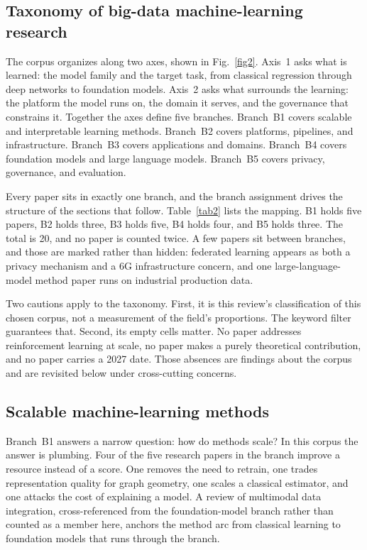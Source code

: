 \documentclass[pdflatex,sn-basic,Numbered]{sn-jnl}%
\begin{document}
\subsection{Taxonomy of big-data machine-learning research}\label{subsec22}

The corpus organizes along two axes, shown in Fig.~\ref{fig2}. Axis~1 asks what is learned: the model family and the target task, from classical regression through deep networks to foundation models. Axis~2 asks what surrounds the learning: the platform the model runs on, the domain it serves, and the governance that constrains it. Together the axes define five branches. Branch~B1 covers scalable and interpretable learning methods. Branch~B2 covers platforms, pipelines, and infrastructure. Branch~B3 covers applications and domains. Branch~B4 covers foundation models and large language models. Branch~B5 covers privacy, governance, and evaluation.

Every paper sits in exactly one branch, and the branch assignment drives the structure of the sections that follow. Table~\ref{tab2} lists the mapping. B1 holds five papers, B2 holds three, B3 holds five, B4 holds four, and B5 holds three. The total is 20, and no paper is counted twice. A few papers sit between branches, and those are marked rather than hidden: federated learning appears as both a privacy mechanism and a 6G infrastructure concern, and one large-language-model method paper runs on industrial production data.

Two cautions apply to the taxonomy. First, it is this review's classification of this chosen corpus, not a measurement of the field's proportions. The keyword filter guarantees that. Second, its empty cells matter. No paper addresses reinforcement learning at scale, no paper makes a purely theoretical contribution, and no paper carries a 2027 date. Those absences are findings about the corpus and are revisited below under cross-cutting concerns.

\subsection{Scalable machine-learning methods}\label{subsec23}

Branch~B1 answers a narrow question: how do methods scale? In this corpus the answer is plumbing. Four of the five research papers in the branch improve a resource instead of a score. One removes the need to retrain, one trades representation quality for graph geometry, one scales a classical estimator, and one attacks the cost of explaining a model. A review of multimodal data integration, cross-referenced from the foundation-model branch rather than counted as a member here, anchors the method arc from classical learning to foundation models that runs through the branch.
\end{document}
